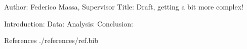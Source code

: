 
Author: Federico Massa, Supervisor
Title: Draft, getting a bit more complex!

Introduction:
Data:
Analysis:
Conclusion: 

References
./references/ref.bib
